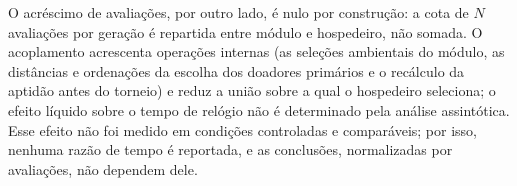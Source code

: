 O acréscimo de avaliações, por outro lado, é nulo por construção: a cota de $N$ avaliações por geração é repartida entre módulo e hospedeiro, não somada. O acoplamento acrescenta operações internas (as seleções ambientais do módulo, as distâncias e ordenações da escolha dos doadores primários e o recálculo da aptidão antes do torneio) e reduz a união sobre a qual o hospedeiro seleciona; o efeito líquido sobre o tempo de relógio não é determinado pela análise assintótica. Esse efeito não foi medido em condições controladas e comparáveis; por isso, nenhuma razão de tempo é reportada, e as conclusões, normalizadas por avaliações, não dependem dele.

